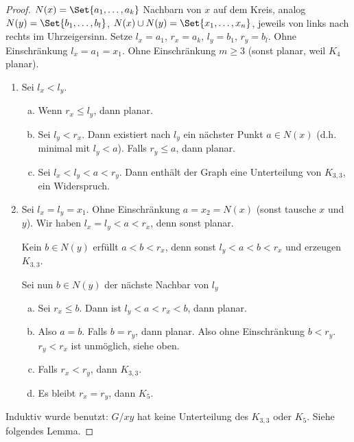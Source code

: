 \begin{st}[Kuratowski, 1930]
\begin{proof}
        $N(x) = \Set{a_1, \dotsc, a_k}$ Nachbarn von $x$ auf dem Kreis, analog $N(y) = \Set{b_1, \dotsc, b_l}$, $N(x) \cup N(y) = \Set{x_1, \dotsc, x_n}$, jeweils von links nach rechts im Uhrzeigersinn.
        Setze $l_x = a_1$, $r_x = a_k$, $l_y = b_1$, $r_y = b_l$.
        Ohne Einschränkung $l_x = a_1 = x_1$.
        Ohne Einschränkung $m \ge 3$ (sonst planar, weil $K_4$ planar).
        \begin{enumerate}[1)]
            \item
                Sei $l_x < l_y$.
                \begin{enumerate}[a)]
                    \item
                        Wenn $r_x \le l_y$, dann planar.
                    \item
                        Sei $l_y < r_x$.
                        Dann existiert nach $l_y$ ein nächster Punkt $a \in N(x)$ (d.h. minimal mit $l_y < a$).
                        Falls $r_y \le a$, dann planar.
                    \item
                        Sei $l_x < l_y < a < r_y$.
                        Dann enthält der Graph eine Unterteilung von $K_{3,3}$, ein Widerspruch.
                \end{enumerate}
            \item
                Sei $l_x = l_y = x_1$.
                Ohne Einschränkung $a = x_2 = N(x)$ (sonst tausche $x$ und $y$).
                Wir haben $l_x = l_y < a < r_x$, denn sonst planar.

                Kein $b \in N(y)$ erfüllt $a < b < r_x$, denn sonst $l_y < a < b < r_x$ und erzeugen $K_{3,3}$.

                Sei nun $b \in N(y)$ der nächste Nachbar von $l_y$
                \begin{enumerate}[a)]
                    \item
                        Sei $r_x \le b$.
                        Dann ist $l_y < a < r_x < b$, dann planar.
                    \item
                        Also $a = b$.
                        Falls $b = r_y$, dann planar.
                        Also ohne Einschränkung $b < r_y$.
                        $r_y < r_x$ ist unmöglich, siehe oben.
                    \item
                        Falls $r_x < r_y$, dann $K_{3,3}$.
                    \item
                        Es bleibt $r_x = r_y$, dann $K_5$.
                \end{enumerate}
        \end{enumerate}
        Induktiv wurde benutzt: $G / xy$ hat keine Unterteilung des $K_{3,3}$ oder $K_5$.
        Siehe folgendes Lemma.
    \end{proof}
\end{st}

